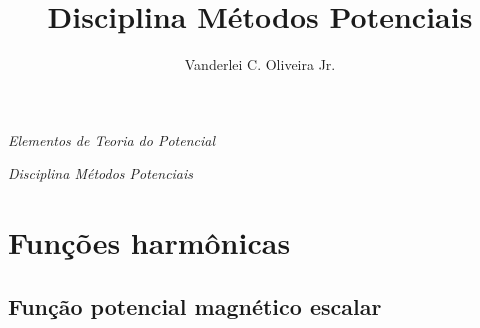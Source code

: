 \documentclass[10pt,a4paper,fleqn]{article}
\title{Disciplina M\'{e}todos Potenciais}
\author{Vanderlei C. Oliveira Jr.}
\date{}
\begin{document}
\begin{center}

\begin{huge}
\emph{Elementos de Teoria do Potencial}
\end{huge}

\bigskip
\bigskip

\begin{large}
\emph{Disciplina M\'{e}todos Potenciais}
\end{large}

\end{center}

\bigskip
\bigskip

\begin{center}


\end{center}

\clearpage

\tableofcontents

\clearpage

\section{Funç\~{o}es harm\^{o}nicas}

\subsection{Funç\~{a}o potencial magn\'{e}tico escalar}
\end{document}
